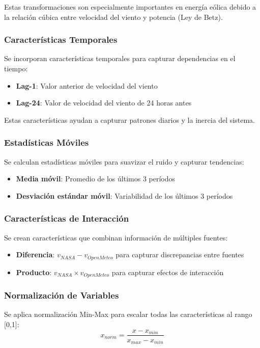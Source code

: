 \documentclass[conference]{IEEEtran}
\begin{document}
	Estas transformaciones son especialmente importantes en energía eólica debido a la relación cúbica entre velocidad del viento y potencia (Ley de Betz).
	
	\subsubsection{Características Temporales}
	Se incorporan características temporales para capturar dependencias en el tiempo:
	\begin{itemize}
		\item \textbf{Lag-1}: Valor anterior de velocidad del viento
		\item \textbf{Lag-24}: Valor de velocidad del viento de 24 horas antes
	\end{itemize}
	
	Estas características ayudan a capturar patrones diarios y la inercia del sistema.
	
	\subsubsection{Estadísticas Móviles}
	Se calculan estadísticas móviles para suavizar el ruido y capturar tendencias:
	\begin{itemize}
		\item \textbf{Media móvil}: Promedio de los últimos 3 períodos
		\item \textbf{Desviación estándar móvil}: Variabilidad de los últimos 3 períodos
	\end{itemize}
	
	\subsubsection{Características de Interacción}
	Se crean características que combinan información de múltiples fuentes:
	\begin{itemize}
		\item \textbf{Diferencia}: $v_{NASA} - v_{OpenMeteo}$ para capturar discrepancias entre fuentes
		\item \textbf{Producto}: $v_{NASA} \times v_{OpenMeteo}$ para capturar efectos de interacción
	\end{itemize}
	
	\subsubsection{Normalización de Variables}
	Se aplica normalización Min-Max para escalar todas las características al rango [0,1]:
	\begin{equation}
		x_{norm} = \frac{x - x_{min}}{x_{max} - x_{min}}
	\end{equation}
	
\end{document}
